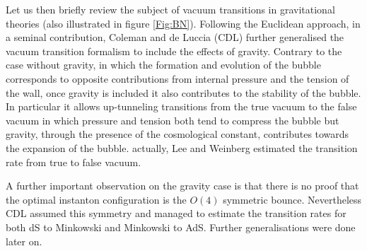 \begin{itemize}
Let us then briefly review the subject of vacuum transitions in gravitational theories (also illustrated in figure \ref{Fig:BN}). Following the Euclidean approach, in a seminal contribution,  Coleman and de Luccia (CDL) \cite{Coleman:1980aw} further generalised the vacuum transition formalism  to include the effects of gravity. Contrary to the case without  gravity, in which the formation and evolution of the bubble corresponds to opposite contributions from internal pressure and the tension of the wall, once gravity is included it also contributes to the stability of the bubble. In particular it allows up-tunneling transitions from the true vacuum to the false vacuum in which pressure and tension both tend to compress the bubble but gravity, through the presence of the cosmological constant, contributes towards the expansion of the bubble. actually, Lee and Weinberg \cite{Lee:1987qc} estimated the transition rate from true to false vacuum.

A further important observation on the gravity case is that there is no proof that  the optimal instanton configuration is the $O(4)$ symmetric bounce. Nevertheless CDL assumed this symmetry and managed to estimate the transition rates for both dS to Minkowski and Minkowski to AdS. Further generalisations were done later on.


\end{itemize}
